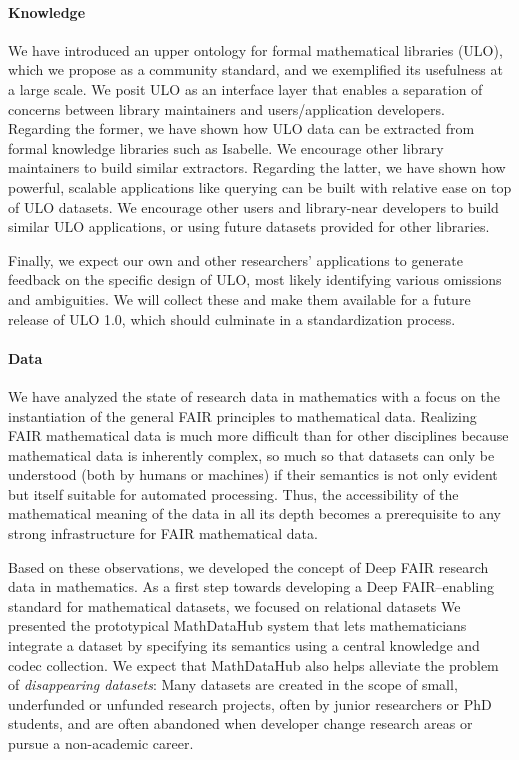 \paragraph{Knowledge}
We have introduced an upper ontology for formal mathematical libraries (ULO), which we propose as a community standard, and we exemplified its usefulness at a large scale.
We posit ULO as an interface layer that enables a separation of concerns between library maintainers and users/application developers.
Regarding the former, we have shown how ULO data can be extracted from formal knowledge libraries such as Isabelle.
We encourage other library maintainers to build similar extractors.
Regarding the latter, we have shown how powerful, scalable applications like querying can be built with relative ease on top of ULO datasets.
We encourage other users and library-near developers to build similar ULO applications, or using future datasets provided for other libraries.

Finally, we expect our own and other researchers' applications to generate feedback on the specific design of ULO, most likely identifying various omissions and ambiguities.
We will collect these and make them available for a future release of ULO 1.0, which should culminate in a standardization process.

\paragraph{Data}
We have analyzed the state of research data in mathematics with a focus on the instantiation of the general FAIR principles to mathematical data.
Realizing FAIR mathematical data is much more difficult than for other disciplines because mathematical data is inherently complex, so much so that datasets can only be understood (both by humans or machines) if their semantics is not only evident but itself suitable for automated processing.
Thus, the accessibility of the mathematical meaning of the data in all its depth becomes a prerequisite to any strong infrastructure for FAIR mathematical data.

Based on these observations, we developed the concept of Deep FAIR research data in mathematics.
As a first step towards developing a Deep FAIR--enabling standard for mathematical datasets, we focused on relational datasets
We presented the prototypical MathDataHub system that lets mathematicians integrate a dataset by specifying its semantics using a central knowledge and codec collection.
We expect that MathDataHub also helps alleviate the problem of \emph{disappearing datasets}:
Many datasets are created in the scope of small, underfunded or unfunded research projects, often by junior researchers or PhD students, and are often abandoned when developer change research areas or pursue a non-academic career.

